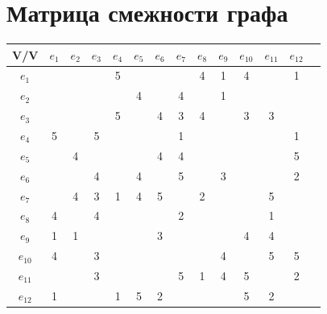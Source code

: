 \documentclass[12pt,a4paper]{report}
\begin{document}
\section*{Матрица смежности графа}
\begin{tabular}{|c|c|c|c|c|c|c|c|c|c|c|c|c|c|}
    \hline
    V/V & $e_{1}$ & $e_{2}$ & $e_{3}$ & $e_{4}$ & $e_{5}$ & $e_{6}$ & $e_{7}$ & $e_{8}$ & $e_{9}$ & $e_{10}$ & $e_{11}$ & $e_{12}$ \\
    \hline
    $e_{1}$  &   &   &   & 5 &   &   &   & 4 & 1 & 4 &   & 1 \\
    \hline
    $e_{2}$  &   &   &   &   & 4 &   & 4 &   & 1 &   &   &   \\
    \hline
    $e_{3}$  &   &   &   & 5 &   & 4 & 3 & 4 &   & 3 & 3 &   \\
    \hline
    $e_{4}$  & 5 &   & 5 &   &   &   & 1 &   &   &   &   & 1 \\
    \hline
    $e_{5}$  &   & 4 &   &   &   & 4 & 4 &   &   &   &   & 5 \\
    \hline
    $e_{6}$  &   &   & 4 &   & 4 &   & 5 &   & 3 &   &   & 2 \\
    \hline
    $e_{7}$  &   & 4 & 3 & 1 & 4 & 5 &   & 2 &   &   & 5 &   \\
    \hline
    $e_{8}$  & 4 &   & 4 &   &   &   & 2 &   &   &   & 1 &   \\
    \hline
    $e_{9}$  & 1 & 1 &   &   &   & 3 &   &   &   & 4 & 4 &   \\
    \hline
    $e_{10}$ & 4 &   & 3 &   &   &   &   &   & 4 &   & 5 & 5 \\
    \hline
    $e_{11}$ &   &   & 3 &   &   &   & 5 & 1 & 4 & 5 &   & 2 \\
    \hline
    $e_{12}$ & 1 &   &   & 1 & 5 & 2 &   &   &   & 5 & 2 &   \\
    \hline
\end{tabular}
\end{document}
